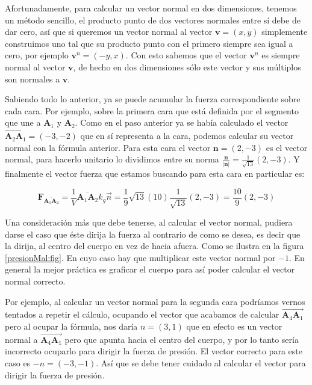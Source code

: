 Afortunadamente, para calcular un vector normal en dos dimensiones, tenemos un método sencillo, el producto punto de dos vectores normales entre sí debe de dar cero, así que si queremos un vector normal al vector $\textbf{v}=(x, y)$ simplemente construimos uno tal que su producto punto con el primero siempre sea igual a cero, por ejemplo $\textbf{v}^n = (-y, x)$.
Con esto sabemos que el vector $\textbf{v}^n$ es siempre normal al vector $\textbf{v}$, de hecho en dos dimensiones sólo este vector y sus múltiplos son normales a $\textbf{v}$.

Sabiendo todo lo anterior, ya se puede acumular la fuerza correspondiente sobre cada cara. Por ejemplo, sobre la primera cara que está definida por el segmento que une a $\textbf{A}_1$ y $\textbf{A}_2$.
Como en el paso anterior ya se había calculado el vector $\overrightarrow{\textbf{A}_2 \textbf{A}_1} = (-3,-2)$ que en sí representa a la cara, podemos calcular su vector normal con la fórmula anterior.
Para esta cara el vector $\textbf{n}=(2,-3)$ es el vector normal, para hacerlo unitario lo dividimos entre su norma $\frac{\textbf{n}}{|\textbf{n}|} = \frac{1}{\sqrt{13}} (2, -3)$.
Y finalmente el vector fuerza que estamos buscando para esta cara en particular es:

$$\textbf{F}_{\overline{\textbf{A}_1 \textbf{A}_2}} = \frac{1}{V}\overline{\textbf{A}_1 \textbf{A}_2} k_g \vec{n} = \frac{1}{9} \sqrt{13} \left( 10 \right)  \frac{1}{\sqrt{13}} (2, -3) = \frac{10}{9}(2, -3) $$

Una consideración más que debe tenerse, al calcular el vector normal, pudiera darse el caso que éste dirija la fuerza al contrario de como se desea, es decir que la dirija, al centro del cuerpo en vez de hacia afuera.
Como se ilustra en la figura \ref{presionMal:fig}.
En cuyo caso hay que multiplicar este vector normal por $-1$.
En general la mejor práctica es graficar el cuerpo para así poder calcular el vector normal correcto.

Por ejemplo, al calcular un vector normal para la segunda cara podríamos vernos tentados a repetir el cálculo, ocupando el vector que acabamos de calcular $\overrightarrow{\textbf{A}_4 \textbf{A}_1}$ pero al ocupar la fórmula, nos daría $n=(3,1)$ que en efecto es un vector normal a $\overrightarrow{\textbf{A}_4 \textbf{A}_1}$ pero que apunta hacia el centro del cuerpo, y por lo tanto sería incorrecto ocuparlo para dirigir la fuerza de presión.
El vector correcto para este caso es $-n = (-3,-1)$.
Así que se debe tener cuidado al calcular el vector para dirigir la fuerza de presión.

